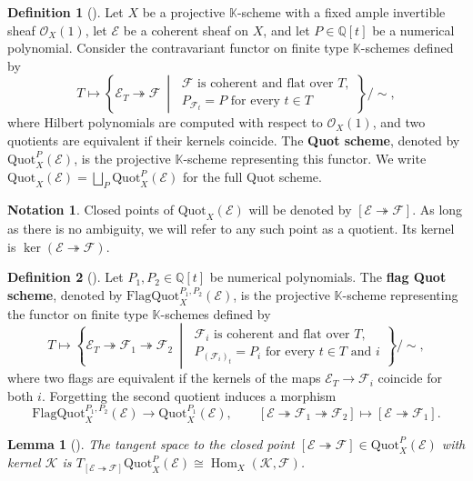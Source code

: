 \documentclass[leqno,11pt,a4paper]{amsart}
\newtheorem{lemma}[lemma]{Lemma}
\theoremstyle{definition}
\newtheorem{notation}[notation]{Notation}
\newtheorem{definition}[definition]{Definition}
\numberwithin{equation}{section}
\newcommand{\kk}{\mathbb{K}}
\newcommand{\bbQ}{\mathbb{Q}}
\newcommand{\Quot}{\mathrm{Quot}}
\newcommand{\EE}{\mathscr{E}}
\newcommand{\FF}{\mathscr{F}}
\newcommand{\OO}{\mathscr{O}}
\newcommand{\KK}{\mathscr{K}}
\DeclareMathOperator{\Hom}{Hom}
\begin{document}
\begin{definition}[{\cite[Theorem 2.2.4]{HL}}]
Let $X$ be a projective $\kk$-scheme with a fixed ample invertible sheaf $\OO_X(1)$, let $\EE$ be a coherent sheaf on $X$, and let $P\in \bbQ[t]$ be a numerical polynomial. 
Consider the contravariant functor on finite type $\kk$-schemes defined by
$$
T \mapsto
\left\{\EE_T\twoheadrightarrow\FF \ \middle|\
\begin{array}{l}
\FF\text{ is coherent and flat over } T,\\
P_{\FF_t}=P\text{ for every } t \in  T
\end{array}
\right\}
\big/\sim,
$$
where Hilbert polynomials are computed with respect to $\OO_X(1)$, and two quotients are equivalent if their kernels coincide. 
The \textbf{Quot scheme}, denoted by $\Quot_X^P(\EE)$, is the projective $\kk$-scheme representing this functor. 
We write $\Quot_X(\EE)=\bigsqcup_P\Quot_X^P(\EE)$ for the full Quot scheme.
\end{definition}

\begin{notation}
Closed points of $\Quot_X(\EE)$ will be denoted by $[\EE \twoheadrightarrow \FF]$. 
As long as there is no ambiguity, we will refer to any such point as a quotient.
Its kernel is $\ker(\EE \twoheadrightarrow \FF)$.
\end{notation}

\begin{definition}[{\cite[Section 2.A.1]{HL}}]
Let $P_1,P_2 \in \bbQ[t]$ be numerical polynomials. The \textbf{flag Quot scheme}, denoted by $\mathrm{FlagQuot}_X^{P_1,P_2}(\EE)$, is the projective $\kk$-scheme representing the functor on finite type $\kk$-schemes defined by
$$
T \mapsto
\left\{\EE_T \twoheadrightarrow\FF_1\twoheadrightarrow\FF_2 \ \middle|\
\begin{array}{l}
\FF_i\text{ is coherent and flat over } T,\\
P_{(\FF_i)_t}=P_i\text{ for every } t \in T \text{ and } i
\end{array}
\right\}
\big/\sim,
$$
where two flags are equivalent if the kernels of the maps
$\EE_T\to\FF_i$ coincide for both $i$. 
Forgetting the second quotient induces a morphism
$$
\mathrm{FlagQuot}_X^{P_1,P_2}(\EE) \longrightarrow\Quot_X^{P_1}(\EE),
\qquad
[\EE\twoheadrightarrow\FF_1\twoheadrightarrow\FF_2] \mapsto [\EE\twoheadrightarrow\FF_1].
$$
\end{definition}



\begin{lemma}[{\cite[Proposition 2.2.7]{HL}}]
The tangent space to the closed point $[\EE\twoheadrightarrow\FF]\in\Quot_X^P(\EE)$ with
kernel $\KK$ is $T_{[\EE\twoheadrightarrow\FF]}\Quot_X^P(\EE)\cong\Hom_X(\KK,\FF)$.
\end{lemma}
\end{document}

